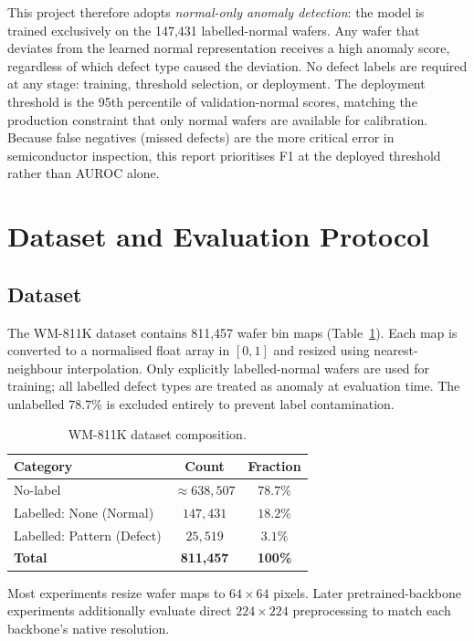 \documentclass[11pt]{article}
\begin{document}
This project therefore adopts \emph{normal-only anomaly detection}: the model
is trained exclusively on the 147,431 labelled-normal wafers. Any wafer that
deviates from the learned normal representation receives a high anomaly score,
regardless of which defect type caused the deviation. No defect labels are
required at any stage: training, threshold selection, or deployment. The
deployment threshold is the 95th percentile of validation-normal scores,
matching the production constraint that only normal wafers are available for
calibration. Because false negatives (missed defects) are the more critical
error in semiconductor inspection, this report prioritises F1 at the deployed
threshold rather than AUROC alone.

\section{Dataset and Evaluation Protocol}

\subsection{Dataset}

The WM-811K dataset contains 811,457 wafer bin maps (Table~\ref{tab:dataset_distribution}).
Each map is converted to a normalised float array in $[0,1]$ and resized using
nearest-neighbour interpolation. Only explicitly labelled-normal wafers are used
for training; all labelled defect types are treated as anomaly at evaluation time.
The unlabelled $78.7\%$ is excluded entirely to prevent label contamination.

\begin{table}[H]
\centering
\caption{WM-811K dataset composition.}
\label{tab:dataset_distribution}
\begin{tabular}{lcc}
\toprule
Category & Count & Fraction \\
\midrule
No-label & ${\approx}638{,}507$ & $78.7\%$ \\
Labelled: None (Normal) & $147{,}431$ & $18.2\%$ \\
Labelled: Pattern (Defect) & $25{,}519$ & $3.1\%$ \\
\midrule
\textbf{Total} & \textbf{811,457} & \textbf{100\%} \\
\bottomrule
\end{tabular}
\end{table}

Most experiments resize wafer maps to $64\!\times\!64$ pixels. Later
pretrained-backbone experiments additionally evaluate direct $224\!\times\!224$
preprocessing to match each backbone's native resolution.
\end{document}
